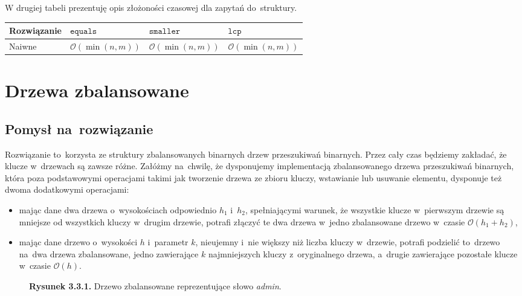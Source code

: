 \documentclass[declaration,shortabstract]{iithesis}
\theoremstyle{definition} \newtheorem{definition}{Definicja}[chapter]
\theoremstyle{plain} \newtheorem{remark}[definition]{Obserwacja}
\theoremstyle{plain} \newtheorem{theorem}[definition]{Twierdzenie}
\theoremstyle{plain} \newtheorem{example}{Przykład}[definition]
\theoremstyle{plain} \newtheorem{lemma}[definition]{Lemat}
\begin{document}
W drugiej tabeli prezentuję opis złożoności czasowej dla zapytań do~struktury.

\begin{center}
    \begin{tabular}{ | m{3cm} | >{\centering\arraybackslash}m{3cm} | >{\centering\arraybackslash}m{3cm} | >{\centering\arraybackslash}m{3cm} | }
        \hline 
        Rozwiązanie & $\texttt{equals}$ & $\texttt{smaller}$ & $\texttt{lcp}$ \\
        \hline
        Naiwne & $\mathcal{O}(\min(n, m))$ & $\mathcal{O}(\min(n, m))$ & $\mathcal{O}(\min(n, m))$ \\
        \hline
    \end{tabular}
\end{center}

\section{Drzewa zbalansowane}

\subsection{Pomysł na~rozwiązanie}

Rozwiązanie to~korzysta ze struktury zbalansowanych binarnych drzew przeszukiwań binarnych. Przez cały czas będziemy zakładać, że klucze w~drzewach są zawsze różne. Załóżmy na~chwilę, że dysponujemy implementacją zbalansowanego drzewa przeszukiwań binarnych, która poza podstawowymi operacjami takimi jak tworzenie drzewa ze zbioru kluczy, wstawianie lub usuwanie elementu, dysponuje też dwoma dodatkowymi operacjami:
\begin{itemize}
    \item mając dane dwa drzewa o~wysokościach odpowiednio $h_1$ i~$h_2$, spełniającymi warunek, że wszystkie klucze w~pierwszym drzewie są mniejsze od wszystkich kluczy w~drugim drzewie, potrafi złączyć te dwa drzewa w~jedno zbalansowane drzewo w~czasie $\mathcal{O}(h_1 + h_2)$,
    \item mając dane drzewo o~wysokości $h$ i~parametr $k$, nieujemny i~nie większy niż liczba kluczy w~drzewie, potrafi podzielić to~drzewo na~dwa drzewa zbalansowane, jedno zawierające $k$ najmniejszych kluczy z~oryginalnego drzewa, a~drugie zawierające pozostałe klucze w~czasie $\mathcal{O}(h)$.
\end{itemize}

\begin{figure}[h]
    \begin{center}
        \caption*{\textbf{Rysunek 3.3.1.} Drzewo zbalansowane reprezentujące słowo \textit{admin}.}
    \end{center}
\end{figure}
\end{document}
